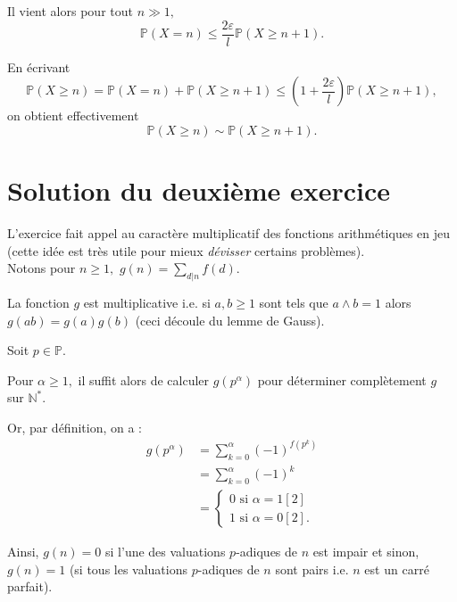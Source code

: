 Il vient alors pour tout $n\gg 1,$ $$ \mathbb{P}(X=n)\leq \frac{2\varepsilon}{l}\mathbb{P}(X\geq n+1).$$

En écrivant $$\mathbb{P}(X\geq n)=\mathbb{P}(X=n)+\mathbb{P}(X\geq n+1)\leq \left(1+\frac{2\varepsilon}{l}\right)\mathbb{P}(X\geq n+1),$$ on obtient effectivement $$\mathbb{P}(X\geq n)\sim \mathbb{P}(X\geq n+1).$$

\section{Solution du deuxième exercice}

L'exercice fait appel au caractère multiplicatif des fonctions arithmétiques en jeu (cette idée est très utile pour mieux \emph{dévisser} certains problèmes).\\

Notons pour $n\geq 1,$ $\displaystyle g(n)=\sum_{d|n}f(d).$ 

La fonction $g$ est multiplicative i.e. si $a,b\geq 1$ sont tels que $a\wedge b=1$ alors $\displaystyle g(ab)=g(a)g(b)$ (ceci découle du lemme de Gauss).

Soit $p\in \mathbb{P}.$ 

Pour $\alpha\geq 1,$ il suffit alors de calculer $g(p^{\alpha})$ pour déterminer complètement $g$ sur $\mathbb{N}^{*}.$

Or, par définition, on a :
\begin{align*}
g(p^{\alpha}) & =\sum_{k=0}^{\alpha}(-1)^{f(p^{k})}\\
& =\sum_{k=0}^{\alpha}(-1)^{k}\\
& =\left\{ \begin{array}{l}
0 \mbox{ si } \alpha=1 [2]\\
1 \mbox{ si } \alpha=0 [2].
\end{array}\right.
\end{align*}

Ainsi, $g(n)=0$ si l'une des valuations $p$-adiques de $n$ est impair et sinon, $g(n)=1$ (si tous les valuations $p$-adiques de $n$ sont pairs i.e. $n$ est un carré parfait).

